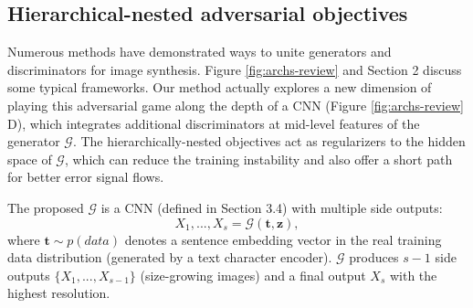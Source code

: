 \documentclass[10pt,twocolumn,letterpaper]{article}
\begin{document}
\subsection{Hierarchical-nested adversarial objectives}
Numerous methods have demonstrated ways to unite generators and discriminators for image synthesis. Figure \ref{fig:archs-review} and Section 2 discuss some typical frameworks.
Our method actually explores a new dimension of playing this adversarial game along the depth of a CNN (Figure \ref{fig:archs-review} D), which integrates additional discriminators at mid-level features of the generator $\mathcal{G}$. 
The hierarchically-nested objectives 
act as regularizers to the hidden space of $\mathcal{G}$, which can reduce the training instability and also offer a short path for better error signal flows.

The proposed $\mathcal{G}$ is a CNN (defined in Section 3.4) with multiple side outputs:
\begin{equation}
\label{side}
X_1,..., X_s = \mathcal{G}(\bm t, \bm z), 
\end{equation}
where  $\bm t\sim p(data)$ denotes a sentence embedding vector in the real training data distribution (generated by a text character encoder). $\mathcal{G}$ produces $s-1$ side outputs $\{X_1,...,X_{s-1}\}$ (size-growing images) and a final output $X_s$ with the highest resolution.

\end{document}
